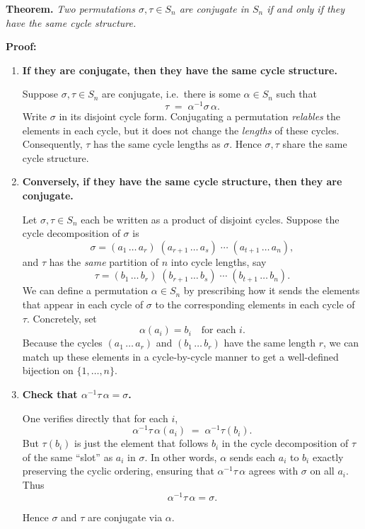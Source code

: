 \documentclass[12pt]{article}
\theoremstyle{definition} %
\theoremstyle{plain} %
\begin{document}
\noindent
\textbf{Theorem.} 
\emph{Two permutations $\sigma,\tau \in S_n$ are conjugate in $S_n$ if and only if they have the same cycle structure.}

\bigskip

\noindent
\textbf{Proof:}

\begin{enumerate}

\item \textbf{If they are conjugate, then they have the same cycle structure.}

\noindent
Suppose $\sigma,\tau \in S_n$ are conjugate, i.e.\ there is some $\alpha \in S_n$ such that 
\[
\tau \;=\; \alpha^{-1}\sigma\,\alpha.
\]
Write $\sigma$ in its disjoint cycle form.  Conjugating a permutation \emph{relables} the elements in each cycle, but it does not change the \emph{lengths} of these cycles.  Consequently, $\tau$ has the same cycle lengths as $\sigma$.  Hence $\sigma,\tau$ share the same cycle structure.

\item \textbf{Conversely, if they have the same cycle structure, then they are conjugate.}

\noindent
Let $\sigma,\tau \in S_n$ each be written as a product of disjoint cycles.  Suppose the cycle decomposition of $\sigma$ is
\[
\sigma = (a_1\,\dots\,a_{r}) \; (a_{r+1}\,\dots\,a_{s}) \;\cdots\; (a_{t+1}\,\dots\,a_n),
\]
and $\tau$ has the \emph{same} partition of $n$ into cycle lengths, say
\[
\tau = (b_1\,\dots\,b_{r}) \; (b_{r+1}\,\dots\,b_{s}) \;\cdots\; (b_{t+1}\,\dots\,b_n).
\]
We can define a permutation $\alpha \in S_n$ by prescribing how it sends the elements that appear in each cycle of $\sigma$ to the corresponding elements in each cycle of $\tau$.  Concretely, set
\[
\alpha(a_i) = b_i 
\quad\text{for each }i.
\]
Because the cycles $(a_1\,\dots\,a_r)$ and $(b_1\,\dots\,b_r)$ have the same length $r$, we can match up these elements in a cycle-by-cycle manner to get a well-defined bijection on $\{1,\dots,n\}$.  

\item \textbf{Check that $\alpha^{-1}\tau\,\alpha = \sigma$.}

\noindent
One verifies directly that for each $i$,
\[
\alpha^{-1}\tau\,\alpha(a_i) \;=\; \alpha^{-1}\tau(b_i).
\]
But $\tau(b_i)$ is just the element that follows $b_i$ in the cycle decomposition of $\tau$ of the same “slot” as $a_i$ in $\sigma$.  In other words, $\alpha$ sends each $a_i$ to $b_i$ exactly preserving the cyclic ordering, ensuring that $\alpha^{-1}\tau\,\alpha$ agrees with $\sigma$ on all $a_i$.  Thus
\[
\alpha^{-1}\tau\,\alpha = \sigma.
\]

Hence $\sigma$ and $\tau$ are conjugate via $\alpha$.

\end{enumerate}
\end{document}
